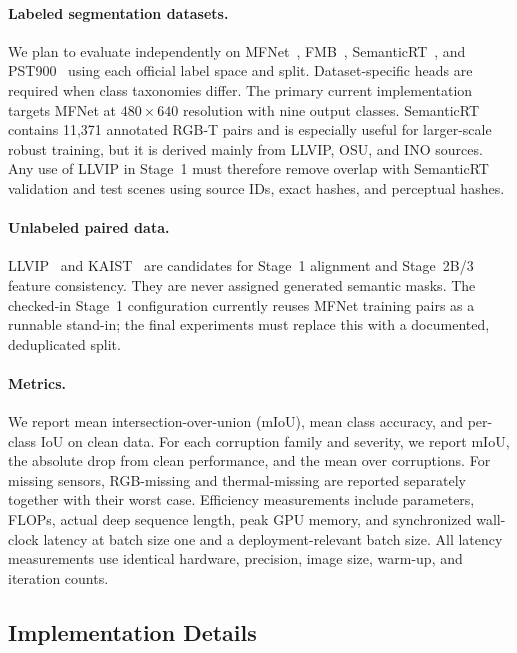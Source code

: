 \documentclass[10pt,twocolumn,letterpaper]{article}
\begin{document}
\paragraph{Labeled segmentation datasets.}
We plan to evaluate independently on MFNet~\cite{ha2017mfnet}, FMB~\cite{liu2023segmif}, SemanticRT~\cite{ji2023semanticrt}, and PST900~\cite{shivakumar2019pst900} using each official label space and split.
Dataset-specific heads are required when class taxonomies differ.
The primary current implementation targets MFNet at $480\times640$ resolution with nine output classes.
SemanticRT contains 11,371 annotated RGB-T pairs and is especially useful for larger-scale robust training, but it is derived mainly from LLVIP, OSU, and INO sources.
Any use of LLVIP in Stage~1 must therefore remove overlap with SemanticRT validation and test scenes using source IDs, exact hashes, and perceptual hashes.

\paragraph{Unlabeled paired data.}
LLVIP~\cite{jia2021llvip} and KAIST~\cite{hwang2015kaist} are candidates for Stage~1 alignment and Stage~2B/3 feature consistency.
They are never assigned generated semantic masks.
The checked-in Stage~1 configuration currently reuses MFNet training pairs as a runnable stand-in; the final experiments must replace this with a documented, deduplicated split.

\paragraph{Metrics.}
We report mean intersection-over-union (mIoU), mean class accuracy, and per-class IoU on clean data.
For each corruption family and severity, we report mIoU, the absolute drop from clean performance, and the mean over corruptions.
For missing sensors, RGB-missing and thermal-missing are reported separately together with their worst case.
Efficiency measurements include parameters, FLOPs, actual deep sequence length, peak GPU memory, and synchronized wall-clock latency at batch size one and a deployment-relevant batch size.
All latency measurements use identical hardware, precision, image size, warm-up, and iteration counts.

\subsection{Implementation Details}
\end{document}
